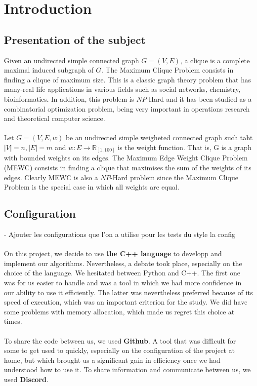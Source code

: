 \documentclass{article}
\begin{document}

\section{Introduction}

\subsection{Presentation of the subject}

    Given an undirected simple connected graph $G =(V,E)$, a clique is a complete maximal induced subgraph of $G$. The Maximum Clique Problem consists in finding a clique of maximum size. This is a classic graph theory problem that has many-real life applications in various fields such as social networks, chemistry, bioinformatics. In addition, this problem is $NP$-Hard and it has been studied as a combinatorial optimization problem, being very important in operations research and theoretical computer science.
    \\ \\
    Let $G = (V,E,w)$ be an undirected simple weigheted connected graph such taht $|V| = n, |E|=m$ and $w : E \rightarrow \mathbb{R}_{[1,100]}$ is the weight function. That is, G is a graph with bounded weights on its edges. The Maximum Edge Weight Clique Problem (MEWC) consists in finding a clique that maximises the sum of the weights of its edges. Clearly MEWC is also a $NP$-Hard problem since the Maximum Clique Problem is the special case in which all weights are equal.


\subsection{Configuration}

    -  Ajouter les configurations que l'on a utilise pour les tests du style la config\\ \\
    On this project, we decide to use \textbf{the C++ language} to developp and implement our algorithms. Nevertheless, a debate took place, especially on the choice of the language. We hesitated between Python and C++. The first one was for us easier to handle and was a tool in which we had more confidence in our ability to use it efficiently. The latter was nevertheless preferred because of its speed of execution, which was an important criterion for the study. We did have some problems with memory allocation, which made us regret this choice at times.  \\ \\
    To share the code between us, we used \textbf{Github}\footnotemark. A tool that was difficult for some to get used to quickly, especially on the configuration of the project at home, but which brought us a significant gain in efficiency once we had understood how to use it. To share information and communicate between us, we used \textbf{Discord}.
    
\end{document}
